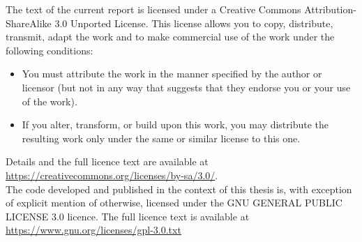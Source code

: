 The text of the current report is licensed under a Creative Commons Attribution-ShareAlike 3.0 Unported License.
This license allows you to copy, distribute, transmit, adapt the work and to make commercial use of the work under the following conditions:

\begin{itemize}
\item You must attribute the work in the manner specified by the author or licensor (but not in any way that suggests that they endorse you or your use of the work).
\item  If you alter, transform, or build upon this work, you may distribute the resulting work only under the same or similar license to this one. 
\end{itemize}

Details and the full licence text are available at \url{https://creativecommons.org/licenses/by-sa/3.0/}.\\

The code developed and published in the context of this thesis is, with exception of explicit mention of otherwise, licensed under the GNU GENERAL PUBLIC LICENSE 3.0 licence. The full licence text is available at \url{https://www.gnu.org/licenses/gpl-3.0.txt}





